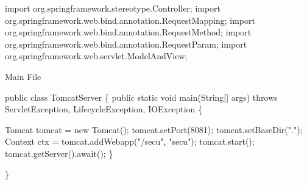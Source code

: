 \documentclass{llncs}%
\begin{document}
import org.springframework.stereotype.Controller;
import org.springframework.web.bind.annotation.RequestMapping;
import org.springframework.web.bind.annotation.RequestMethod;
import org.springframework.web.bind.annotation.RequestParam;
import org.springframework.web.servlet.ModelAndView;

\nwendcode{}\nwdocspar

\nwenddocs{}\endmoddef\nwstartdeflinemarkup\nwenddeflinemarkup
\LA{}Main File~{\nwtagstyle{}}\RA{}
\nwendcode{}\nwdocspar

\nwenddocs{}\endmoddef\nwstartdeflinemarkup{}\nwenddeflinemarkup
public class TomcatServer \{
    public static void main(String[] args) throws ServletException, LifecycleException, IOException \{

        Tomcat tomcat = new Tomcat();
        tomcat.setPort(8081);
        tomcat.setBaseDir(".");
        Context ctx = tomcat.addWebapp("/secu", "secu");
        tomcat.start();
        tomcat.getServer().await();
    \}

\}
\nwendcode{}
\end{document}
